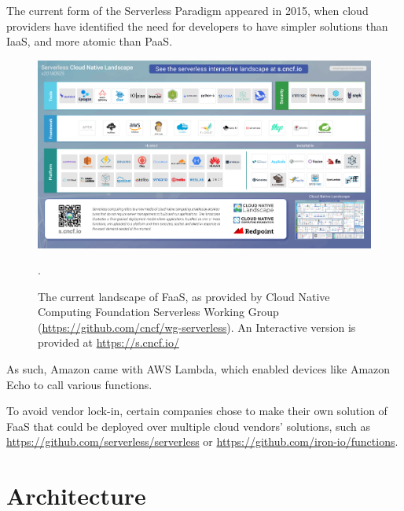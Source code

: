 \documentclass[runningheads]{llncs}
\begin{document}
The current form of the Serverless Paradigm appeared in 2015, when cloud providers have identified the need for developers to have simpler solutions than IaaS, and more atomic than PaaS.

\begin{figure}
    \centering
    \includegraphics[scale=0.25]{assets/CNCF_landscape_min.png}
    \caption[SOTA-Landscape]{The current landscape of FaaS, as provided by Cloud Native Computing Foundation Serverless Working Group (\url{https://github.com/cncf/wg-serverless}). An Interactive version is provided at \url{https://s.cncf.io/}}.
    \label{fig:SOTA-Landscape}
\end{figure}

 As such, Amazon came with AWS Lambda, which enabled devices like Amazon Echo to call various functions.
 
 To avoid vendor lock-in, certain companies chose to make their own solution of FaaS that could be deployed over multiple cloud vendors' solutions, such as \url{https://github.com/serverless/serverless} or \url{https://github.com/iron-io/functions}.
 

\FloatBarrier
\section{Architecture}

\end{document}
